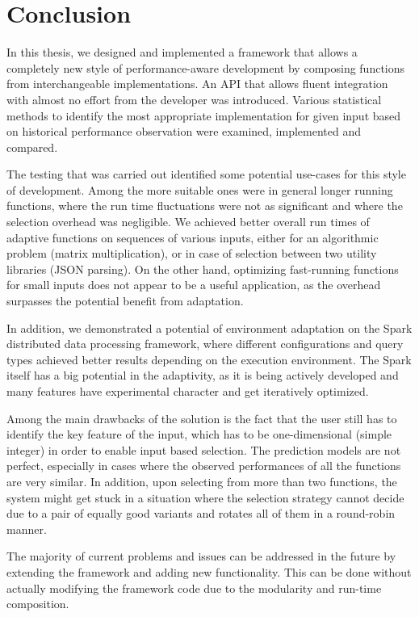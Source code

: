 \chapter*{Conclusion}

In this thesis, we designed and implemented a framework that allows a completely new style of performance-aware development by composing functions from interchangeable implementations. An API that allows fluent integration with almost no effort from the developer was introduced. Various statistical methods to identify the most appropriate implementation for given input based on historical performance observation were examined, implemented and compared.

The testing that was carried out identified some potential use-cases for this style of development. Among the more suitable ones were in general longer running functions, where the run time fluctuations were not as significant and where the selection overhead was negligible. We achieved better overall run times of adaptive functions on sequences of various inputs, either for an algorithmic problem (matrix multiplication), or in case of selection between two utility libraries (JSON parsing). On the other hand, optimizing fast-running functions for small inputs does not appear to be a useful application, as the overhead surpasses the potential benefit from adaptation.

In addition, we demonstrated a potential of environment adaptation on the Spark distributed data processing framework, where different configurations and query types achieved better results depending on the execution environment. The Spark itself has a big potential in the adaptivity, as it is being actively developed and many features have experimental character and get iteratively optimized.

Among the main drawbacks of the solution is the fact that the user still has to identify the key feature of the input, which has to be one-dimensional (simple integer) in order to enable input based selection. The prediction models are not perfect, especially in cases where the observed performances of all the functions are very similar. In addition, upon selecting from more than two functions, the system might get stuck in a situation where the selection strategy cannot decide due to a pair of equally good variants and rotates all of them in a round-robin manner.

The majority of current problems and issues can be addressed in the future by extending the framework and adding new functionality. This can be done without actually modifying the framework code due to the modularity and run-time composition.

